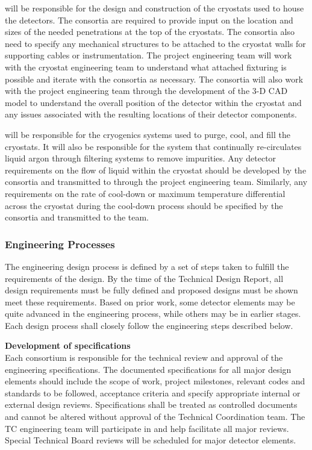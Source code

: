  will be responsible for the design and construction of the
cryostats used to house the detectors.  The consortia are required to
provide input on the location and sizes of the needed penetrations at
the top of the cryostats.  The consortia also need to specify any
mechanical structures to be attached to the cryostat walls for
supporting cables or instrumentation.  The  project engineering
team will work with the  cryostat engineering team to understand
what attached fixturing is possible and iterate with the consortia as
necessary.  The consortia will also work with the project engineering
team through the development of the 3-D CAD model to understand the
overall position of the detector within the cryostat and any issues
associated with the resulting locations of their detector components.

 will be responsible for the cryogenics systems used to purge,
cool, and fill the cryostats.  It will also be responsible for the
system that continually re-circulates liquid argon through filtering
systems to remove impurities.  Any detector requirements on the flow
of liquid within the cryostat should be developed by the consortia and
transmitted to  through the project engineering team.  Similarly,
any requirements on the rate of cool-down or maximum temperature
differential across the cryostat during the cool-down process should
be specified by the consortia and transmitted to the  team.



\subsubsection{Engineering Processes}
\label{ssec:fdsp-coord-integ-eng-processes}

The engineering design process is defined by a set of steps taken to
fulfill the requirements of the design.  By the time of the Technical
Design Report, all design requirements must be fully defined and
proposed designs must be shown meet these requirements.  Based on
prior work, some detector elements may be quite advanced in the
engineering process, while others may be in earlier stages.  Each
design process shall closely follow the engineering steps described
below.


{\bf Development of specifications}\\
Each consortium is responsible for the technical review and approval
of the engineering specifications.  The documented specifications for
all major design elements should include the scope of work, project
milestones, relevant codes and standards to be followed, acceptance
criteria and specify appropriate internal or external design reviews.
Specifications shall be treated as controlled documents and cannot be
altered without approval of the  Technical Coordination team.  The
TC engineering team will participate in and help facilitate all
major reviews.  Special Technical Board reviews will be scheduled for
major detector elements.

